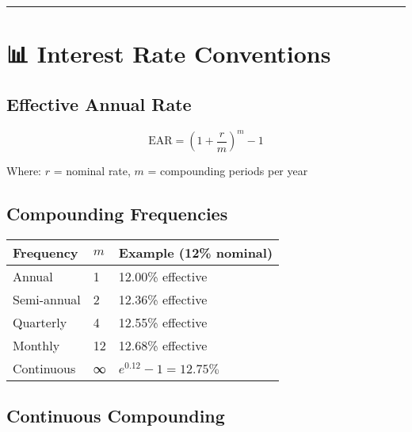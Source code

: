 \documentclass[
  letterpaper,
]{scrbook}
\begin{document}
\FloatBarrier

\begin{center}\rule{0.5\linewidth}{0.5pt}\end{center}

\section*{📊 Interest Rate Conventions}\label{interest-rate-conventions}


\subsection*{Effective Annual Rate}\label{effective-annual-rate}

\[
\text{EAR} = \left(1 + \frac{r}{m}\right)^m - 1
\]

Where: \(r\) = nominal rate, \(m\) = compounding periods per year

\subsection*{Compounding Frequencies}\label{compounding-frequencies}

\begin{longtable}[]{@{}lll@{}}
\toprule\noalign{}
Frequency & \(m\) & Example (12\% nominal) \\
\midrule\noalign{}
\endhead
\bottomrule\noalign{}
\endlastfoot
Annual & 1 & 12.00\% effective \\
Semi-annual & 2 & 12.36\% effective \\
Quarterly & 4 & 12.55\% effective \\
Monthly & 12 & 12.68\% effective \\
Continuous & ∞ & \(e^{0.12} - 1 = 12.75\%\) \\
\end{longtable}

\FloatBarrier

\subsection*{Continuous Compounding}\label{continuous-compounding-1}
\end{document}

